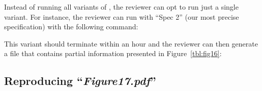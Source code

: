 Instead of running all variants of \toolname, the reviewer can opt to run just a single variant. 
For instance, the reviewer can run \toolname with ``Spec 2'' (our most precise specification) with the following command:\\

This variant should terminate within an hour and the reviewer can then generate a  file that contains partial information presented in Figure~\ref{tbl:fig16}:\\


\subsection{Reproducing ``\emph{Figure17.pdf}''}


